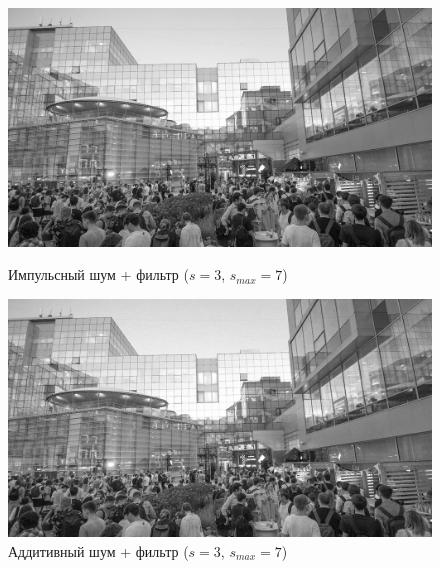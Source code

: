 \documentclass[a4paper]{article}
\begin{document}
\begin{figure}[H]
    \begin{minipage}{0.49\textwidth}
        \centering \includegraphics[width=\textwidth]{images/3_nonlinear_filters/impulse - adaptive median (s_start=3, s_max=7).jpg}
        \caption{Импульсный шум + фильтр ($s = 3$, $s_{max}=7$)}
    \end{minipage}\hfill
    \begin{minipage}{0.49\textwidth}
        \centering \includegraphics[width=\textwidth]{images/3_nonlinear_filters/additive - adaptive median (s_start=3, s_max=7).jpg}
        \caption{Аддитивный шум + фильтр ($s = 3$, $s_{max}=7$)}
    \end{minipage}
\end{figure}
\end{document}

